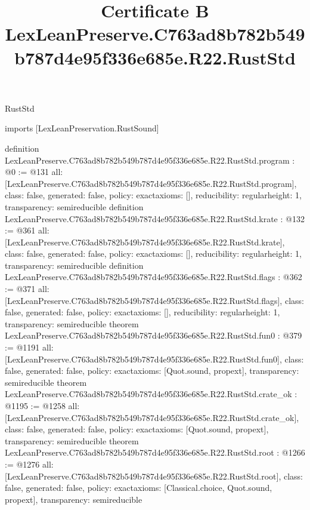 \begin{lexlean}{RustStd}
\title{Certificate B LexLeanPreserve.C763ad8b782b549b787d4e95f336e685e.R22.RustStd}
\begin{coremodule}
imports [LexLeanPreservation.RustSound]

definition LexLeanPreserve.C763ad8b782b549b787d4e95f336e685e.R22.RustStd.program : @0 := @131 {
  all: [LexLeanPreserve.C763ad8b782b549b787d4e95f336e685e.R22.RustStd.program],
  class: false,
  generated: false,
  policy: exact{axioms: []},
  reducibility: regular{height: 1},
  transparency: semireducible
}
definition LexLeanPreserve.C763ad8b782b549b787d4e95f336e685e.R22.RustStd.krate : @132 := @361 {
  all: [LexLeanPreserve.C763ad8b782b549b787d4e95f336e685e.R22.RustStd.krate],
  class: false,
  generated: false,
  policy: exact{axioms: []},
  reducibility: regular{height: 1},
  transparency: semireducible
}
definition LexLeanPreserve.C763ad8b782b549b787d4e95f336e685e.R22.RustStd.flags : @362 := @371 {
  all: [LexLeanPreserve.C763ad8b782b549b787d4e95f336e685e.R22.RustStd.flags],
  class: false,
  generated: false,
  policy: exact{axioms: []},
  reducibility: regular{height: 1},
  transparency: semireducible
}
theorem LexLeanPreserve.C763ad8b782b549b787d4e95f336e685e.R22.RustStd.fun0 : @379 := @1191 {
  all: [LexLeanPreserve.C763ad8b782b549b787d4e95f336e685e.R22.RustStd.fun0],
  class: false,
  generated: false,
  policy: exact{axioms: [Quot.sound, propext]},
  transparency: semireducible
}
theorem LexLeanPreserve.C763ad8b782b549b787d4e95f336e685e.R22.RustStd.crate_ok : @1195 := @1258 {
  all: [LexLeanPreserve.C763ad8b782b549b787d4e95f336e685e.R22.RustStd.crate_ok],
  class: false,
  generated: false,
  policy: exact{axioms: [Quot.sound, propext]},
  transparency: semireducible
}
theorem LexLeanPreserve.C763ad8b782b549b787d4e95f336e685e.R22.RustStd.root : @1266 := @1276 {
  all: [LexLeanPreserve.C763ad8b782b549b787d4e95f336e685e.R22.RustStd.root],
  class: false,
  generated: false,
  policy: exact{axioms: [Classical.choice, Quot.sound, propext]},
  transparency: semireducible
}


\end{coremodule}
\end{lexlean}
